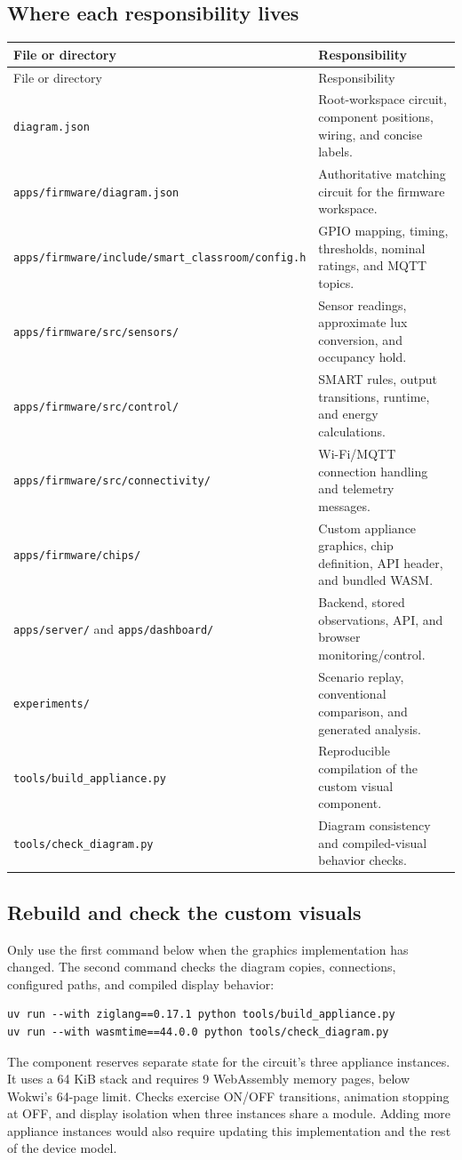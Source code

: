 \documentclass[11pt,a4paper]{article}
\newcommand{\file}[1]{\nolinkurl{#1}}
\begin{document}
\subsection{Where each responsibility lives}
\begin{longtable}{@{}p{}p{}@{}}
\toprule
File or directory & Responsibility \\
\midrule
\endfirsthead
\toprule
File or directory & Responsibility \\
\midrule
\endhead
\file{diagram.json} &
Root-workspace circuit, component positions, wiring, and concise labels. \\
\file{apps/firmware/diagram.json} &
Authoritative matching circuit for the firmware workspace. \\
\file{apps/firmware/include/smart_classroom/config.h} &
GPIO mapping, timing, thresholds, nominal ratings, and MQTT topics. \\
\file{apps/firmware/src/sensors/} &
Sensor readings, approximate lux conversion, and occupancy hold. \\
\file{apps/firmware/src/control/} &
SMART rules, output transitions, runtime, and energy calculations. \\
\file{apps/firmware/src/connectivity/} &
Wi-Fi/MQTT connection handling and telemetry messages. \\
\file{apps/firmware/chips/} &
Custom appliance graphics, chip definition, API header, and bundled WASM. \\
\file{apps/server/} and \file{apps/dashboard/} &
Backend, stored observations, API, and browser monitoring/control. \\
\file{experiments/} &
Scenario replay, conventional comparison, and generated analysis. \\
\file{tools/build_appliance.py} &
Reproducible compilation of the custom visual component. \\
\file{tools/check_diagram.py} &
Diagram consistency and compiled-visual behavior checks. \\
\bottomrule
\end{longtable}

\subsection{Rebuild and check the custom visuals}
Only use the first command below when the graphics implementation has
changed. The second command checks the diagram copies, connections,
configured paths, and compiled display behavior:
\begin{lstlisting}
uv run --with ziglang==0.17.1 python tools/build_appliance.py
uv run --with wasmtime==44.0.0 python tools/check_diagram.py
\end{lstlisting}
The component reserves separate state for the circuit's three appliance
instances. It uses a 64 KiB stack and requires 9 WebAssembly memory
pages, below Wokwi's 64-page limit. Checks exercise ON/OFF transitions,
animation stopping at OFF, and display isolation when three instances
share a module. Adding more appliance instances would also require
updating this implementation and the rest of the device model.
\end{document}
